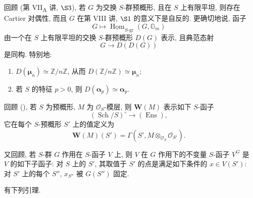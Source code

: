 
回顾 (第 VII\textsubscript{A} 讲, \(\S3\)), 若 \(G\) 为交换 \(S\)-群预概形,
且在 \(S\) 上有限平坦, 则存在 Cartier 对偶性, 而且 \(G\) 在第 VIII 讲, \(\S1\)
的意义下是自反的. 更确切地说, 函子
\[
  G\longmapsto
  \underline{\operatorname{Hom}}_{S\text{-gr}}(G,\mathbb G_m)
\]
由一个在 \(S\) 上有限平坦的交换 \(S\)-群预概形 \(D(G)\) 表示, 且典范态射
\[
  G\longrightarrow D(D(G))
\]
是同构. 特别地:
\begin{enumerate}
\item[(i)] \(D(\boldsymbol\mu_n)\simeq\mathbb Z/n\mathbb Z\), 从而
\(D(\mathbb Z/n\mathbb Z)\simeq\boldsymbol\mu_n\);
\item[(ii)] 若 \(S\) 的特征 \(p>0\), 则
\(D(\boldsymbol\alpha_p)\simeq\boldsymbol\alpha_p\).
\end{enumerate}


回顾 (), 若 \(S\) 为预概形,
\(M\) 为 \(\mathcal O_S\)-模层, 则 \(\mathbf W(M)\) 表示如下 \(S\)-函子
\[
  (\operatorname{Sch}/S)^\circ\longrightarrow(\operatorname{Ens}),
\]
它在每个 \(S\)-预概形 \(S'\) 上的值定义为
\[
  \mathbf W(M)(S')
  =\Gamma\!\left(S',M\otimes_{\mathcal O_S}\mathcal O_{S'}\right).
\]

又回顾, 若 \(S\)-群 \(G\) 作用在 \(S\)-函子 \(V\) 上,
则 \(V\) 在 \(G\) 作用下的不变量 \(S\)-函子 \(V^G\) 是 \(V\) 的如下子函子:
对 \(S\) 上的 \(S'\), 其取值于 \(S'\) 的点是满足如下条件的 \(x\in V(S')\):
对 \(S'\) 上的每个 \(S''\), \(x_{S''}\) 被 \(G(S'')\) 固定.

有下列引理.

